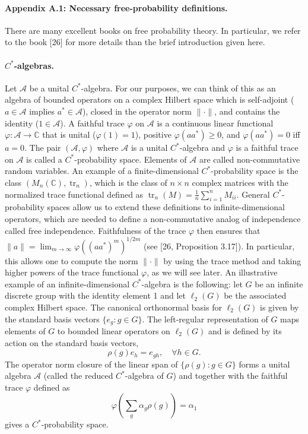 \paragraph{Appendix A.1: Necessary free-probability definitions.}
There are many excellent books on free probability theory. In particular, we refer to the book [26] for more details than the brief introduction given here.
\paragraph{$C^*$-algebras.}
Let $\mathcal A$ be a unital $C^*$-algebra. For our purposes, we can think of this as an algebra of bounded operators on a complex Hilbert space which is self-adjoint ($a\in\mathcal A$ implies $a^*\in\mathcal A$), closed in the operator norm $\|\cdot\|$, and contains the identity ($1\in\mathcal A$). A faithful trace $\varphi$ on $\mathcal A$ is a continuous linear functional $\varphi:\mathcal A\to\mathbb C$ that is unital ($\varphi(1)=1$), positive $\varphi(aa^*)\geq0$, and $\varphi(aa^*)=0$ iff $a=0$.
The pair $(\mathcal A,\varphi)$ where $\mathcal A$ is a unital $C^*$-algebra and $\varphi$ is a faithful trace on $\mathcal A$ is called a $C^*$-probability space. Elements of $\mathcal A$ are called non-commutative random variables. An example of a finite-dimensional $C^*$-probability space is the class $(M_n(\mathbb C),\operatorname{tr}_n)$, which is the class of $n\times n$ complex matrices with the normalized trace functional defined as $\operatorname{tr}_n(M)=\frac1n\sum_{i=1}^nM_{ii}$. General $C^*$-probability spaces allow us to extend these definitions to infinite-dimensional operators, which are needed to define a non-commutative analog of independence called free independence. Faithfulness of the trace $\varphi$ then ensures that $\|a\|=\lim_{m\to\infty}\varphi((aa^*)^m)^{1/2m}$ (see [26, Proposition 3.17]). In particular, this allows one to compute the norm $\|\cdot\|$ by using the trace method and taking higher powers of the trace functional $\varphi$, as we will see later.
An illustrative example of an infinite-dimensional $C^*$-algebra is the following: let $G$ be an infinite discrete group with the identity element 1 and let $\ell_2(G)$ be the associated complex Hilbert space. The canonical orthonormal basis for $\ell_2(G)$ is given by the standard basis vectors $\{e_g:g\in G\}$. The left-regular representation of $G$ maps elements of $G$ to bounded linear operators on $\ell_2(G)$ and is defined by its action on the standard basis vectors,
\[\rho(g)e_h=e_{gh},\quad\forall h\in G.\]
The operator norm closure of the linear span of $\{\rho(g):g\in G\}$ forms a unital algebra $\mathcal A$ (called the reduced $C^*$-algebra of $G$) and together with the faithful trace $\varphi$ defined as
\[\varphi\left(\sum_g\alpha_g\rho(g)\right)=\alpha_1\]
gives a $C^*$-probability space.
